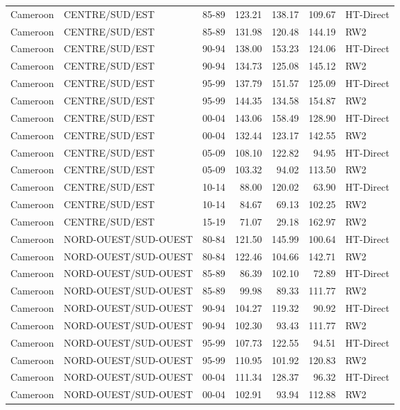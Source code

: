 \begin{longtable}{lllrrrl}
  Cameroon & CENTRE/SUD/EST & 85-89 & 123.21 & 138.17 & 109.67 & HT-Direct \\ 
  Cameroon & CENTRE/SUD/EST & 85-89 & 131.98 & 120.48 & 144.19 & RW2 \\ 
  Cameroon & CENTRE/SUD/EST & 90-94 & 138.00 & 153.23 & 124.06 & HT-Direct \\ 
  Cameroon & CENTRE/SUD/EST & 90-94 & 134.73 & 125.08 & 145.12 & RW2 \\ 
  Cameroon & CENTRE/SUD/EST & 95-99 & 137.79 & 151.57 & 125.09 & HT-Direct \\ 
  Cameroon & CENTRE/SUD/EST & 95-99 & 144.35 & 134.58 & 154.87 & RW2 \\ 
  Cameroon & CENTRE/SUD/EST & 00-04 & 143.06 & 158.49 & 128.90 & HT-Direct \\ 
  Cameroon & CENTRE/SUD/EST & 00-04 & 132.44 & 123.17 & 142.55 & RW2 \\ 
  Cameroon & CENTRE/SUD/EST & 05-09 & 108.10 & 122.82 & 94.95 & HT-Direct \\ 
  Cameroon & CENTRE/SUD/EST & 05-09 & 103.32 & 94.02 & 113.50 & RW2 \\ 
  Cameroon & CENTRE/SUD/EST & 10-14 & 88.00 & 120.02 & 63.90 & HT-Direct \\ 
  Cameroon & CENTRE/SUD/EST & 10-14 & 84.67 & 69.13 & 102.25 & RW2 \\ 
  Cameroon & CENTRE/SUD/EST & 15-19 & 71.07 & 29.18 & 162.97 & RW2 \\ 
  Cameroon & NORD-OUEST/SUD-OUEST & 80-84 & 121.50 & 145.99 & 100.64 & HT-Direct \\ 
  Cameroon & NORD-OUEST/SUD-OUEST & 80-84 & 122.46 & 104.66 & 142.71 & RW2 \\ 
  Cameroon & NORD-OUEST/SUD-OUEST & 85-89 & 86.39 & 102.10 & 72.89 & HT-Direct \\ 
  Cameroon & NORD-OUEST/SUD-OUEST & 85-89 & 99.98 & 89.33 & 111.77 & RW2 \\ 
  Cameroon & NORD-OUEST/SUD-OUEST & 90-94 & 104.27 & 119.32 & 90.92 & HT-Direct \\ 
  Cameroon & NORD-OUEST/SUD-OUEST & 90-94 & 102.30 & 93.43 & 111.77 & RW2 \\ 
  Cameroon & NORD-OUEST/SUD-OUEST & 95-99 & 107.73 & 122.55 & 94.51 & HT-Direct \\ 
  Cameroon & NORD-OUEST/SUD-OUEST & 95-99 & 110.95 & 101.92 & 120.83 & RW2 \\ 
  Cameroon & NORD-OUEST/SUD-OUEST & 00-04 & 111.34 & 128.37 & 96.32 & HT-Direct \\ 
  Cameroon & NORD-OUEST/SUD-OUEST & 00-04 & 102.91 & 93.94 & 112.88 & RW2 \\ 

\end{longtable}
